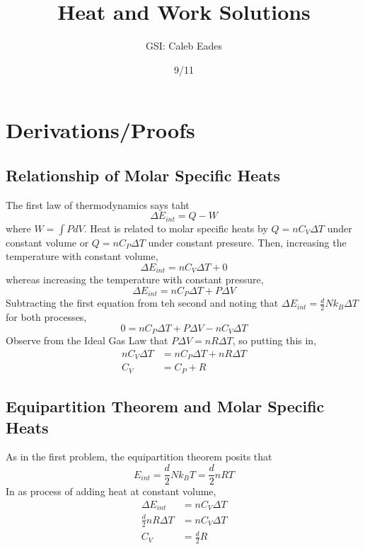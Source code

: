 \documentclass{article}
\begin{document}
	
\title{Heat and Work Solutions}
\author{GSI: Caleb Eades}
\date{9/11}
\maketitle

\section{Derivations/Proofs}

\subsection{Relationship of Molar Specific Heats}

The first law of thermodynamics says taht
\begin{equation}
\Delta E_{int} = Q-W
\end{equation}
where $W=\int PdV$. Heat is related to molar specific heats by $Q=nC_V\Delta T$ under constant volume or $Q=nC_P\Delta T$ under constant pressure. Then, increasing the temperature with constant volume,
\begin{equation}
\Delta E_{int} = nC_V\Delta T + 0
\end{equation}
whereas increasing the temperature with constant pressure,
\begin{equation}
\Delta E_{int} = nC_P\Delta T + P\Delta V
\end{equation}
Subtracting the first equation from teh second and noting that $\Delta E_{int} = \frac{d}{2}Nk_B\Delta T$ for both processes,
\begin{equation}
0 = nC_P\Delta T + P\Delta V - nC_V\Delta T
\end{equation}
Observe from the Ideal Gas Law that $P\Delta V = nR\Delta T$, so putting this in,
\begin{align*}
nC_V\Delta T &= nC_P\Delta T + nR\Delta T \\
C_V &= C_P + R
\end{align*}

\subsection{Equipartition Theorem and Molar Specific Heats}

As in the first problem, the equipartition theorem posits that
\begin{equation}
E_{int} = \frac{d}{2}Nk_B T = \frac{d}{2}nRT
\end{equation}
In as process of adding heat at constant volume,
\begin{align*}
\Delta E_{int} &= nC_V \Delta T \\
\frac{d}{2}nR\Delta T &= nC_V\Delta T \\
C_V &= \frac{d}{2}R
\end{align*}
\end{document}
